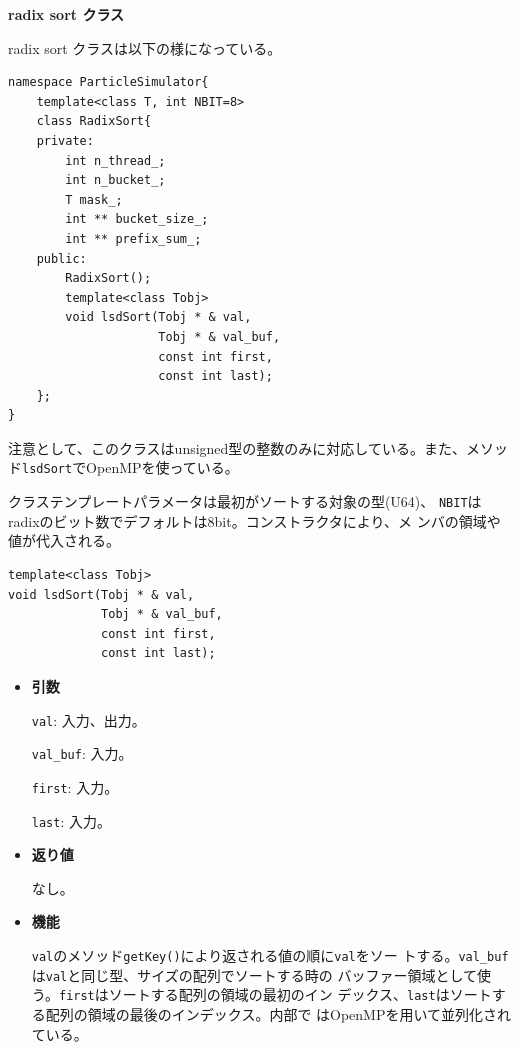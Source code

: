 \newpage

{\bf radix sort クラス}

radix sort クラスは以下の様になっている。

\begin{lstlisting}[caption=RadixSort]
namespace ParticleSimulator{
    template<class T, int NBIT=8>
    class RadixSort{
    private:
        int n_thread_;
        int n_bucket_;
        T mask_;
        int ** bucket_size_;
        int ** prefix_sum_;
    public:
        RadixSort();
        template<class Tobj>
        void lsdSort(Tobj * & val,
                     Tobj * & val_buf,
                     const int first,
                     const int last);
    };
}
\end{lstlisting}

注意として、このクラスはunsigned型の整数のみに対応している。また、メソッ
ド{\tt lsdSort}でOpenMPを使っている。

クラステンプレートパラメータは最初がソートする対象の型(U64)、
{\tt NBIT}はradixのビット数でデフォルトは8bit。コンストラクタにより、メ
ンバの領域や値が代入される。

\begin{screen}
\begin{verbatim}
template<class Tobj>
void lsdSort(Tobj * & val,
             Tobj * & val_buf,
             const int first,
             const int last);

\end{verbatim}
\end{screen}

\begin{itemize}

\item{{\bf 引数}}

{\tt val}: 入力、出力。

{\tt val\_buf}: 入力。

{\tt first}: 入力。

{\tt last}: 入力。

\item{{\bf 返り値}}

なし。

\item{{\bf 機能}}

{\tt val}のメソッド{\tt getKey()}により返される値の順に{\tt val}をソー
トする。{\tt val\_buf}は{\tt val}と同じ型、サイズの配列でソートする時の
バッファー領域として使う。{\tt first}はソートする配列の領域の最初のイン
デックス、{\tt last}はソートする配列の領域の最後のインデックス。内部で
はOpenMPを用いて並列化されている。

\end{itemize}

